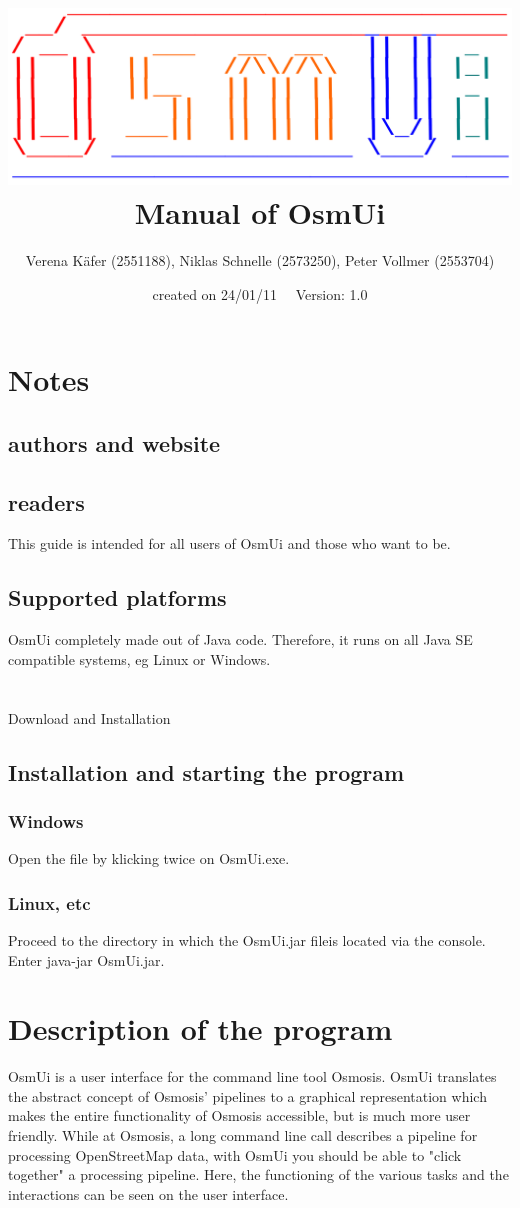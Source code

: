 \documentclass[a4paper,10pt]{scrartcl}
\author {Verena Käfer (2551188), Niklas Schnelle (2573250), Peter Vollmer (2553704)}
\date {created on 24/01/11 \ \
Version: 1.0}
\title {\includegraphics [width = 15cm ]{../projektplan/Logo_Osmui.png}  \\
Manual of OsmUi}
\begin{document}
\maketitle
\newpage
\tableofcontents
\newpage

\section {Notes}
\subsection {authors and website}
\subsection {readers}
This guide is intended for all users of OsmUi and those who want to be.
\subsection {Supported platforms}
OsmUi completely made out of Java code. Therefore, it runs on all Java SE compatible systems, eg Linux or Windows.


\section {} Download and Installation
\subsection {Installation and starting the program}
\subsubsection {Windows}
Open the file by klicking twice on OsmUi.exe.
\subsubsection {Linux, etc}
Proceed to the directory in which the OsmUi.jar fileis located via the console. Enter java-jar OsmUi.jar.

\section {Description of the program}
OsmUi is a user interface for the command line tool Osmosis. OsmUi translates the abstract concept of Osmosis' pipelines to a graphical representation which makes the entire functionality of Osmosis accessible, but is much more user friendly. While at Osmosis, a long command line call describes a pipeline for processing OpenStreetMap data, with OsmUi you should be able to "click together" a processing pipeline. Here, the functioning of the various tasks and the interactions can be seen on the user interface. 
\end{document}
